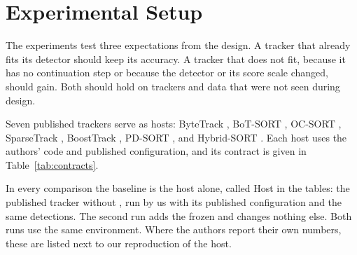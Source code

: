 \section{Experimental Setup}\label{sec:setup}

The experiments test three expectations from the design. A tracker that
already fits its detector should keep its accuracy. A tracker that does not
fit, because it has no continuation step or because the detector or its
score scale changed, should gain. Both should hold on trackers and data that
were not seen during design.

\label{sec:hosts}Seven published trackers serve as hosts: ByteTrack
\cite{zhang2022bytetrack}, BoT-SORT \cite{aharon2022botsort}, OC-SORT
\cite{cao2023ocsort}, SparseTrack \cite{liu2025sparsetrack}, BoostTrack
\cite{stanojevic2024boosttrack}, PD-SORT \cite{wang2025pdsort}, and
Hybrid-SORT \cite{yang2024hybridsort}. Each host uses the authors' code and
published configuration, and its contract is given in
Table~\ref{tab:contracts}.

In every comparison the baseline is the host alone, called Host in the
tables: the published tracker without \scl{}, run by us with its published
configuration and the same detections. The
second run adds the frozen \scl{} and changes nothing else. Both runs use the
same environment. Where the authors report their own numbers, these are
listed next to our reproduction of the host.
